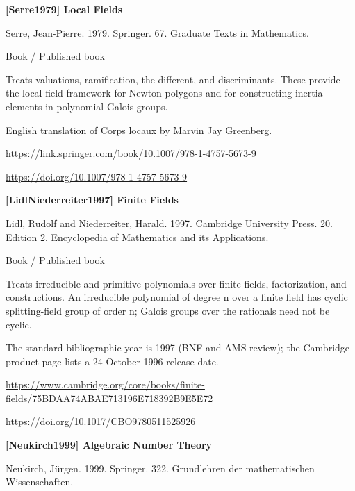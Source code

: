 \documentclass[11pt,a4paper,oneside,openany]{book}
\begin{document}
\hypertarget{ref:Serre1979}{}
{\sffamily\bfseries\color{atlasgreen}[Serre1979] Local Fields}\par
\color{black} Serre, Jean-Pierre. 1979. Springer. 67. Graduate Texts in Mathematics.\par
{\small\sffamily\color{atlasgold}Book / Published book}\par
\color{black} Treats valuations, ramification, the different, and discriminants. These provide the local field framework for Newton polygons and for constructing inertia elements in polynomial Galois groups.\par
{\small English translation of Corps locaux by Marvin Jay Greenberg.}\par
{\footnotesize\url{https://link.springer.com/book/10.1007/978-1-4757-5673-9}}\par
{\footnotesize\url{https://doi.org/10.1007/978-1-4757-5673-9}}\par
\vspace{9pt}
\hypertarget{ref:LidlNiederreiter1997}{}
{\sffamily\bfseries\color{atlasgreen}[LidlNiederreiter1997] Finite Fields}\par
\color{black} Lidl, Rudolf and Niederreiter, Harald. 1997. Cambridge University Press. 20. Edition 2. Encyclopedia of Mathematics and its Applications.\par
{\small\sffamily\color{atlasgold}Book / Published book}\par
\color{black} Treats irreducible and primitive polynomials over finite fields, factorization, and constructions. An irreducible polynomial of degree n over a finite field has cyclic splitting-field group of order n; Galois groups over the rationals need not be cyclic.\par
{\small The standard bibliographic year is 1997 (BNF and AMS review); the Cambridge product page lists a 24 October 1996 release date.}\par
{\footnotesize\url{https://www.cambridge.org/core/books/finite-fields/75BDAA74ABAE713196E718392B9E5E72}}\par
{\footnotesize\url{https://doi.org/10.1017/CBO9780511525926}}\par
\vspace{9pt}
\hypertarget{ref:Neukirch1999}{}
{\sffamily\bfseries\color{atlasgreen}[Neukirch1999] Algebraic Number Theory}\par
\color{black} Neukirch, Jürgen. 1999. Springer. 322. Grundlehren der mathematischen Wissenschaften.\par
\end{document}
